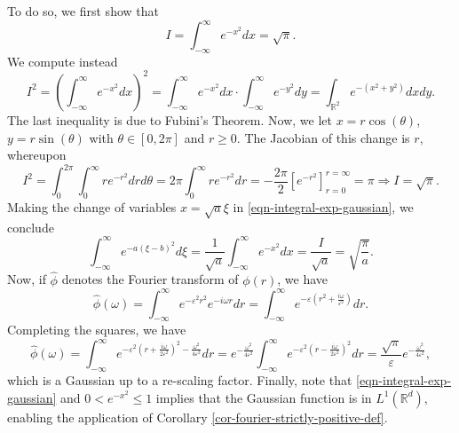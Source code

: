 \documentclass[12pt]{report} %
\begin{document}
To do so, we first show that
  \begin{equation}
    I = \int_{- \infty}^{\infty} e^{- x^2} d x = \sqrt{\pi} .
    \label{eqn-integral-exp-gaussian}
  \end{equation}
  We compute instead
  \[ I^2 = \left( \int_{- \infty}^{\infty} e^{- x^2} d x \right)^2 = \int_{-
     \infty}^{\infty} e^{- x^2} d x \cdot \int_{- \infty}^{\infty} e^{- y^2} d
     y = \int_{\mathbb{R}^2} e^{- (x^2 + y^2)} d x d y. \]
  The last inequality is due to Fubini's Theorem. Now, we let $x = r \cos
  (\theta)$, $y = r \sin (\theta)$ with $\theta \in [0, 2 \pi]$ and $r \geq
  0$. The Jacobian of this change is $r$, whereupon
  \[ I^2 = \int_0^{2 \pi} \int_0^{\infty} r e^{- r^2} d r d \theta = 2 \pi
     \int_0^{\infty} r e^{- r^2} d r = - \frac{2 \pi}{2} [e^{- r^2}]_{r =
     0}^{r = \infty} = \pi \Rightarrow I = \sqrt{\pi} . \]
  Making the change of variables $x = \sqrt{a} \xi$ in
  \eqref{eqn-integral-exp-gaussian}, we conclude
  \[ \int_{- \infty}^{\infty} e^{- a (\xi - b)^2} d \xi = \frac{1}{\sqrt{a}}
     \int_{- \infty}^{\infty} e^{- x^2} d x = \frac{I}{\sqrt{a}} =
     \sqrt{\frac{\pi}{a}} . \]
  Now, if $\hat{\phi}$ denotes the Fourier transform of $\phi (r)$, we have
  \[ \hat{\phi} (\omega) = \int_{- \infty}^{\infty} e^{- \varepsilon^2 r^2}
     e^{- i \omega r} d r = \int_{- \infty}^{\infty} e^{- \varepsilon \left(
     r^2 + \frac{i \omega}{\varepsilon^2} \right)} d r. \]
  Completing the squares, we have
  \[ \hat{\phi} (\omega) = \int_{- \infty}^{\infty} e^{- \varepsilon^2 \left(
     r + \frac{i \omega}{2 \varepsilon^2} \right)^2 - \frac{\omega^2}{4
     \varepsilon^2}} d r = e^{- \frac{\omega^2}{4 \varepsilon^2}} \int_{-
     \infty}^{\infty} e^{- \varepsilon^2 \left( r - \frac{i \omega}{2
     \varepsilon^2} \right)^2} d r = \frac{\sqrt{\pi}}{\varepsilon} e^{-
     \frac{\omega^2}{4 \varepsilon^2}}, \]
  which is a Gaussian up to a re-scaling factor. Finally, note that
  \eqref{eqn-integral-exp-gaussian} and $0 < e^{- x^2} \leq 1$ implies that the
  Gaussian function is in $L^1 (\mathbb{R}^d)$, enabling the application of Corollary \ref{cor-fourier-strictly-positive-def}.
\end{document}
